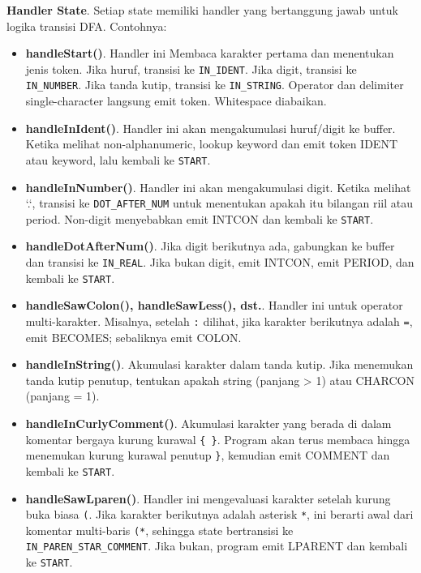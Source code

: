 \textbf{Handler State}. Setiap state memiliki handler yang bertanggung jawab untuk logika transisi DFA. Contohnya:

\begin{itemize}
    \item \textbf{handleStart()}. Handler ini Membaca karakter pertama dan menentukan jenis token. Jika huruf, transisi ke \texttt{IN\_IDENT}. Jika digit, transisi ke \texttt{IN\_NUMBER}. Jika tanda kutip, transisi ke \texttt{IN\_STRING}. Operator dan delimiter single-character langsung emit token. Whitespace diabaikan.

    \item \textbf{handleInIdent()}. Handler ini akan mengakumulasi huruf/digit ke buffer. Ketika melihat non-alphanumeric, lookup keyword dan emit token IDENT atau keyword, lalu kembali ke \texttt{START}.

    \item \textbf{handleInNumber()}. Handler ini akan mengakumulasi digit. Ketika melihat `.`, transisi ke \texttt{DOT\_AFTER\_NUM} untuk menentukan apakah itu bilangan riil atau period. Non-digit menyebabkan emit INTCON dan kembali ke \texttt{START}.

    \item \textbf{handleDotAfterNum()}. Jika digit berikutnya ada, gabungkan ke buffer dan transisi ke \texttt{IN\_REAL}. Jika bukan digit, emit INTCON, emit PERIOD, dan kembali ke \texttt{START}.

    \item \textbf{handleSawColon(), handleSawLess(), dst.}. Handler ini untuk operator multi-karakter. Misalnya, setelah \texttt{:} dilihat, jika karakter berikutnya adalah \texttt{=}, emit BECOMES; sebaliknya emit COLON.

    \item \textbf{handleInString()}. Akumulasi karakter dalam tanda kutip. Jika menemukan tanda kutip penutup, tentukan apakah string (panjang > 1) atau CHARCON (panjang = 1).

    \item \textbf{handleInCurlyComment()}. Akumulasi karakter yang berada di dalam komentar bergaya kurung kurawal \texttt{\{ \}}. Program akan terus membaca hingga menemukan kurung kurawal penutup \texttt{\}}, kemudian emit COMMENT dan kembali ke \texttt{START}.

    \item \textbf{handleSawLparen()}. Handler ini mengevaluasi karakter setelah kurung buka biasa \texttt{(}. Jika karakter berikutnya adalah asterisk \texttt{*}, ini berarti awal dari komentar multi-baris \texttt{(*}, sehingga state bertransisi ke \texttt{IN\_PAREN\_STAR\_COMMENT}. Jika bukan, program emit LPARENT dan kembali ke \texttt{START}.


\end{itemize}
